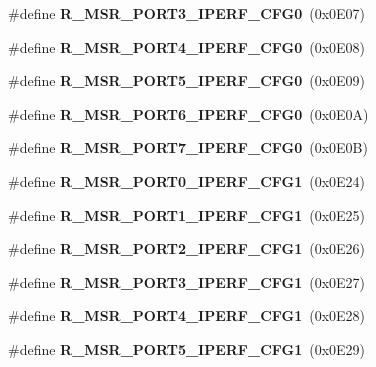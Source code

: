 \begin{DoxyCompactItemize}
\item 
\#define {\bfseries R\+\_\+\+M\+S\+R\+\_\+\+P\+O\+R\+T3\+\_\+\+I\+P\+E\+R\+F\+\_\+\+C\+F\+G0}~(0x0\+E07)\label{types_8h_a2a07b8a385a63c2ead3d2473903329b3}

\item 
\#define {\bfseries R\+\_\+\+M\+S\+R\+\_\+\+P\+O\+R\+T4\+\_\+\+I\+P\+E\+R\+F\+\_\+\+C\+F\+G0}~(0x0\+E08)\label{types_8h_a4644cdd3eb864a2d2be73d029501705c}

\item 
\#define {\bfseries R\+\_\+\+M\+S\+R\+\_\+\+P\+O\+R\+T5\+\_\+\+I\+P\+E\+R\+F\+\_\+\+C\+F\+G0}~(0x0\+E09)\label{types_8h_a5a572317282e8caaea64576e7fff3dbf}

\item 
\#define {\bfseries R\+\_\+\+M\+S\+R\+\_\+\+P\+O\+R\+T6\+\_\+\+I\+P\+E\+R\+F\+\_\+\+C\+F\+G0}~(0x0\+E0\+A)\label{types_8h_a02ac6e4efb4adbb600d19ad98d84046b}

\item 
\#define {\bfseries R\+\_\+\+M\+S\+R\+\_\+\+P\+O\+R\+T7\+\_\+\+I\+P\+E\+R\+F\+\_\+\+C\+F\+G0}~(0x0\+E0\+B)\label{types_8h_a05482e85080156c7a265712e73995b37}

\item 
\#define {\bfseries R\+\_\+\+M\+S\+R\+\_\+\+P\+O\+R\+T0\+\_\+\+I\+P\+E\+R\+F\+\_\+\+C\+F\+G1}~(0x0\+E24)\label{types_8h_a7c7005e95afe6bdd361e8ade30627387}

\item 
\#define {\bfseries R\+\_\+\+M\+S\+R\+\_\+\+P\+O\+R\+T1\+\_\+\+I\+P\+E\+R\+F\+\_\+\+C\+F\+G1}~(0x0\+E25)\label{types_8h_a4c47a3f8aa06e7d10f841b78fde05113}

\item 
\#define {\bfseries R\+\_\+\+M\+S\+R\+\_\+\+P\+O\+R\+T2\+\_\+\+I\+P\+E\+R\+F\+\_\+\+C\+F\+G1}~(0x0\+E26)\label{types_8h_a98c0c5acc29e6147895d11f6bb4de11e}

\item 
\#define {\bfseries R\+\_\+\+M\+S\+R\+\_\+\+P\+O\+R\+T3\+\_\+\+I\+P\+E\+R\+F\+\_\+\+C\+F\+G1}~(0x0\+E27)\label{types_8h_abebfaa2fde6310a3ce85e0e0311bb97d}

\item 
\#define {\bfseries R\+\_\+\+M\+S\+R\+\_\+\+P\+O\+R\+T4\+\_\+\+I\+P\+E\+R\+F\+\_\+\+C\+F\+G1}~(0x0\+E28)\label{types_8h_acdcb6fc1a7d8ad0aeac8d24a72a3b741}

\item 
\#define {\bfseries R\+\_\+\+M\+S\+R\+\_\+\+P\+O\+R\+T5\+\_\+\+I\+P\+E\+R\+F\+\_\+\+C\+F\+G1}~(0x0\+E29)\label{types_8h_a6e177e80a2f158692aed8377762e9f94}


\end{DoxyCompactItemize}

